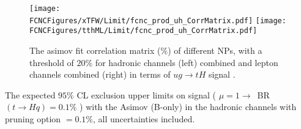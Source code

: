 \begin{figure}[H]
\centering
\texttt{[image: \\FCNCFigures/xTFW/Limit/fcnc\_prod\_uh\_CorrMatrix.pdf]}
\texttt{[image: \\FCNCFigures/tthML/Limit/fcnc\_prod\_uh\_CorrMatrix.pdf]}
\caption{ The asimov fit correlation matrix ($\%$) of different NPs, with a threshold of $20\%$ for hadronic channels (left) combined and lepton channels combined (right) in terms of $ug\to tH$ signal . }
\label{fig:fcnc_prod_uh_CorrMatrix}
\end{figure}




\begin{table}
\caption{The expected $95\%$ CL exclusion upper limits on signal ( $\mu=1\to$~BR$(t\to Hq)=0.1\%$ ) with the Asimov (B-only) in the hadronic channels with pruning option $=0.1\%$, all uncertainties included.}
\label{tab:limit_pruned}

\end{table}



\newpage